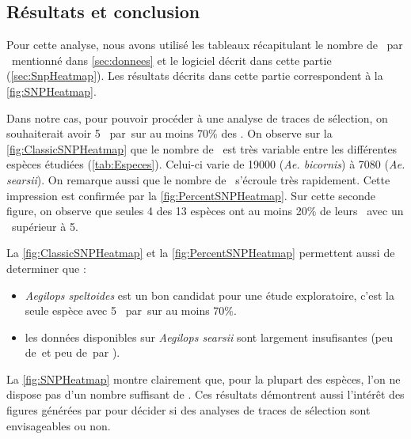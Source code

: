 \documentclass[../main]{subfiles} %
\begin{document}
\subsection{Résultats et conclusion}
\label{sec:SNP_Results}
Pour cette analyse, nous avons utilisé les tableaux récapitulant le nombre de \SNP par \contig mentionné dans \ref{sec:donnees} et le logiciel décrit dans cette partie (\cref{sec:SnpHeatmap}). Les résultats décrits dans cette partie correspondent à la \cref{fig:SNPHeatmap}.

Dans notre cas, pour pouvoir procéder à une analyse de  traces de sélection, on souhaiterait avoir 5 \SNP par \contigs\,sur au moins 70\% des \contig.
On observe sur la \cref{fig:ClassicSNPHeatmap} que le nombre de \contigs est très variable entre les différentes espèces étudiées (\ref{tab:Especes}). Celui-ci varie de \num{19 000} (\textit{Ae. bicornis}) à \num{7 080} (\textit{Ae. searsii}). On remarque aussi que le nombre de \SNP s'écroule très rapidement. Cette impression est confirmée par la \cref{fig:PercentSNPHeatmap}. Sur cette seconde figure, on observe que seules 4 des 13 espèces ont au moins 20\% de leurs \contigs avec un \NbSNP supérieur à \num{5}.

La \cref{fig:ClassicSNPHeatmap} et la \cref{fig:PercentSNPHeatmap} permettent aussi de determiner que :

\begin{itemize}
\item \textit{Aegilops speltoides} est un bon candidat pour une étude exploratoire, c'est la seule espèce avec 5 \SNP par \contig\,sur au moins 70\%.

\item les données disponibles sur \textit{Aegilops searsii} sont largement insufisantes (peu de \reads\,et peu de \SNP\,par \contig ).

\end{itemize}

La \cref{fig:SNPHeatmap} montre clairement que, pour la plupart des espèces, l'on ne dispose pas d’un nombre suffisant de \SNP. Ces résultats démontrent aussi l’intérêt des figures générées par \cite{florent_f-marchalsnpheatmap_2024} pour décider si des analyses de traces de sélection sont envisageables ou non. 


\end{document}

